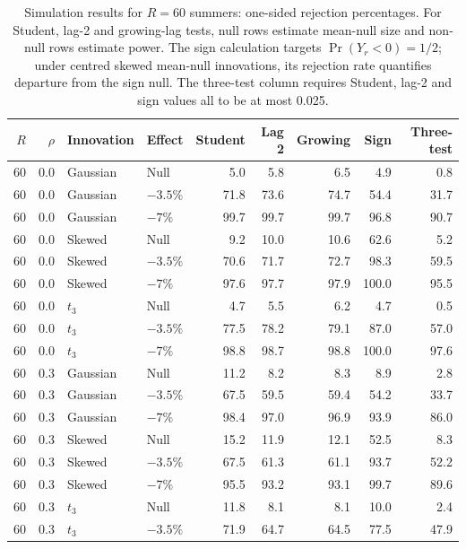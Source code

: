 \begin{table}[H]
\centering
\normalsize\renewcommand{\arraystretch}{1.55}\setlength{\tabcolsep}{4pt}
\caption{Simulation results for $R=60$ summers: one-sided rejection percentages. For Student, lag-2 and growing-lag tests, null rows estimate mean-null size and non-null rows estimate power. The sign calculation targets $\Pr(Y_r<0)=1/2$; under centred skewed mean-null innovations, its rejection rate quantifies departure from the sign null. The three-test column requires Student, lag-2 and sign values all to be at most 0.025.}
\label{tab:year-simulation-complete-c-r60}
\begin{tabular*}{\textwidth}{@{\extracolsep{\fill}}rrllrrrrr}
\toprule
$R$ & $\rho$ & Innovation & Effect & Student & Lag 2 & Growing & Sign & Three-test \\
\midrule
60 & 0.0 & Gaussian & Null & 5.0 & 5.8 & 6.5 & 4.9 & 0.8 \\
60 & 0.0 & Gaussian & $-3.5\%$ & 71.8 & 73.6 & 74.7 & 54.4 & 31.7 \\
60 & 0.0 & Gaussian & $-7\%$ & 99.7 & 99.7 & 99.7 & 96.8 & 90.7 \\
60 & 0.0 & Skewed & Null & 9.2 & 10.0 & 10.6 & 62.6 & 5.2 \\
60 & 0.0 & Skewed & $-3.5\%$ & 70.6 & 71.7 & 72.7 & 98.3 & 59.5 \\
60 & 0.0 & Skewed & $-7\%$ & 97.6 & 97.7 & 97.9 & 100.0 & 95.5 \\
60 & 0.0 & $t_3$ & Null & 4.7 & 5.5 & 6.2 & 4.7 & 0.5 \\
60 & 0.0 & $t_3$ & $-3.5\%$ & 77.5 & 78.2 & 79.1 & 87.0 & 57.0 \\
60 & 0.0 & $t_3$ & $-7\%$ & 98.8 & 98.7 & 98.8 & 100.0 & 97.6 \\
60 & 0.3 & Gaussian & Null & 11.2 & 8.2 & 8.3 & 8.9 & 2.8 \\
60 & 0.3 & Gaussian & $-3.5\%$ & 67.5 & 59.5 & 59.4 & 54.2 & 33.7 \\
60 & 0.3 & Gaussian & $-7\%$ & 98.4 & 97.0 & 96.9 & 93.9 & 86.0 \\
60 & 0.3 & Skewed & Null & 15.2 & 11.9 & 12.1 & 52.5 & 8.3 \\
60 & 0.3 & Skewed & $-3.5\%$ & 67.5 & 61.3 & 61.1 & 93.7 & 52.2 \\
60 & 0.3 & Skewed & $-7\%$ & 95.5 & 93.2 & 93.1 & 99.7 & 89.6 \\
60 & 0.3 & $t_3$ & Null & 11.8 & 8.1 & 8.1 & 10.0 & 2.4 \\
60 & 0.3 & $t_3$ & $-3.5\%$ & 71.9 & 64.7 & 64.5 & 77.5 & 47.9 \\

\end{tabular*}
\end{table}

